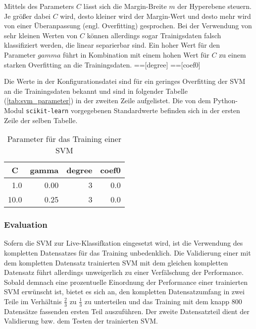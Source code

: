 Mittels des Parameters $C$ lässt sich die Margin-Breite $m$ der Hyperebene steuern.
Je größer dabei $C$ wird, desto kleiner wird der Margin-Wert und desto mehr wird von einer Überanpassung (engl. Overfitting) gesprochen.
Bei der Verwendung von sehr kleinen Werten von $C$ können allerdings sogar Trainigsdaten falsch klassifiziert werden, die linear separierbar sind.
Ein hoher Wert für den Parameter $gamma$ führt in Kombination mit einem hohen Wert für $C$ zu einem starken Overfitting an die Trainingsdaten.
==[degree]
==[coef0]

Die Werte in der Konfigurationsdatei sind für ein geringes Overfitting der \ac{SVM} an die Trainingsdaten bekannt und sind in folgender Tabelle (\autoref{tab:svm_parameter}) in der zweiten Zeile aufgelistet.
Die von dem Python-Modul \texttt{scikit-learn} vorgegebenen Standardwerte befinden sich in der ersten Zeile der selben Tabelle.

\begin{table}[h]
\centering
\begin{tabular}{rrrr}
\hline
  \multicolumn{1}{c}{\textbf{C}} & \multicolumn{1}{c}{\textbf{gamma}} & \multicolumn{1}{c}{\textbf{degree}} & \multicolumn{1}{c}{\textbf{coef0}} \\
 \hline
 1.0 & 0.00 & 3 & 0.0 \\
 \hline
 10.0 & 0.25 & 3 & 0.0 \\
\hline
\end{tabular}
\caption[Parameter für das Training einer SVM]{Parameter für das Training einer SVM}
\label{tab:svm_parameter}
\end{table}


\subsubsection{Evaluation}\label{sec:svm_evaluation}
Sofern die \ac{SVM} zur Live-Klassifkation eingesetzt wird, ist die Verwendung des kompletten Datensatzes für das Training unbedenklich.
Die Validierung einer mit dem kompletten Datensatz trainierten \ac{SVM} mit dem gleichen kompletten Datensatz führt allerdings unweigerlich zu einer Verfälschung der Performance.
Sobald demnach eine prozentuelle Einordnung der Performance einer trainierten \ac{SVM} erwünscht ist, bietet es sich an, den kompletten Datensatzumfang in zwei Teile im Verhältnis $\frac{2}{3}$ zu $\frac{1}{3}$ zu unterteilen und das Training mit dem knapp 800 Datensätze fassenden ersten Teil auszuführen.
Der zweite Datensatzteil dient der Validierung bzw. dem Testen der trainierten \ac{SVM}.

